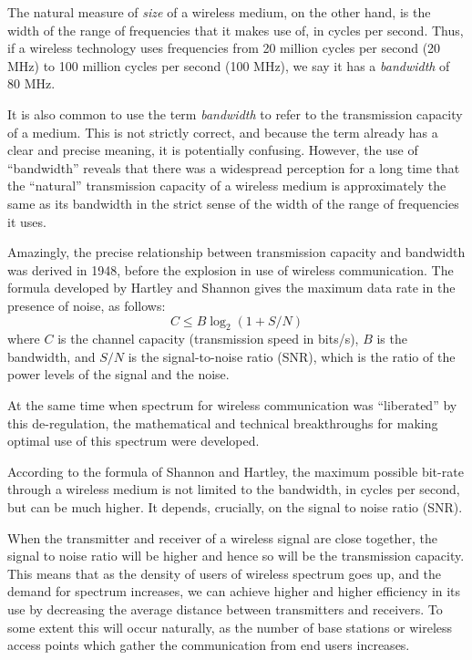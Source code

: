 The natural measure of {\em size} of a wireless medium, on the other hand, is the
width of the range of frequencies that it makes use of, in cycles per second. Thus,
if a wireless technology uses frequencies from 20 million cycles per second (20 MHz)
to 100 million cycles per second (100 MHz), we say it has a {\em bandwidth} of
80 MHz.

It is also common to use the term {\em bandwidth} to refer to the transmission capacity of
a medium. This is not strictly correct, and because the term already has a clear and precise
meaning, it is potentially confusing. However, the use of ``bandwidth'' reveals that there
was a widespread perception for a long time that the ``natural'' transmission capacity of 
a wireless medium is approximately the same as its bandwidth in the strict sense of the
width of the range of frequencies it uses. 

Amazingly, the precise relationship between transmission capacity and bandwidth was derived
in 1948, before the explosion in use of wireless communication. The formula developed by 
Hartley and Shannon gives the maximum data rate in the presence of noise,
as follows:
$$
C \leq B \log_{2} (1 + S/N)
$$
where $C$ is the channel capacity (transmission speed in bits/s), $B$ is the bandwidth, and $S/N$ is the 
signal-to-noise ratio (SNR),
which is the ratio of the power levels of the signal and the noise. 

At the same time when spectrum for wireless communication was ``liberated''
by this de-regulation, the mathematical and technical breakthroughs for making
optimal use of this spectrum were developed. 

According to the formula of Shannon and Hartley, the maximum possible
bit-rate through a wireless medium is not limited to the bandwidth, in cycles per
second, but can be much higher. It depends, crucially, on the signal to noise ratio 
(SNR).

When the transmitter and receiver of a wireless signal are close together, the
signal to noise ratio will be higher and hence so will be the transmission capacity.
This means that as the density of users of wireless spectrum goes up, and the demand for
spectrum increases, we can achieve higher and higher efficiency in its use by 
decreasing the average distance between transmitters and receivers. To some extent
this will occur naturally, as the number of base stations or wireless access points
which gather the communication from end users increases.

